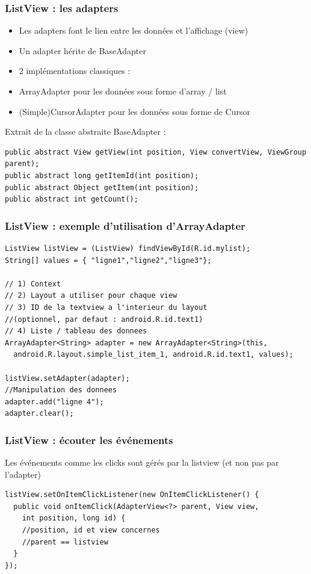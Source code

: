 \documentclass{beamer}
\begin{document}
\begin{frame}[fragile]
\frametitle{ListView : les adapters}
\begin{itemize}
  \item Les adapters font le lien entre les données et l'affichage (view) 
  \item Un adapter hérite de BaseAdapter
  \item 2 implémentations classiques : 
  \item ArrayAdapter pour les données sous forme d'array / list
  \item (Simple)CursorAdapter pour les données sous forme de Cursor
\end{itemize}
Extrait de la classe abstraite BaseAdapter :
\begin{lstlisting}
public abstract View getView(int position, View convertView, ViewGroup parent);
public abstract long getItemId(int position);
public abstract Object getItem(int position);
public abstract int getCount();
\end{lstlisting}
\end{frame}
\begin{frame}[fragile]
\frametitle{ListView : exemple d'utilisation d'ArrayAdapter}
\begin{lstlisting}
ListView listView = (ListView) findViewById(R.id.mylist);
String[] values = { "ligne1","ligne2","ligne3"};

// 1) Context
// 2) Layout a utiliser pour chaque view
// 3) ID de la textview a l'interieur du layout 
//(optionnel, par defaut : android.R.id.text1) 
// 4) Liste / tableau des donnees
ArrayAdapter<String> adapter = new ArrayAdapter<String>(this,
  android.R.layout.simple_list_item_1, android.R.id.text1, values);

listView.setAdapter(adapter); 
//Manipulation des donnees
adapter.add("ligne 4");
adapter.clear();
\end{lstlisting}
\end{frame}
\begin{frame}[fragile]
\frametitle{ListView : écouter les événements}
Les événements comme les clicks sont gérés par la listview (et non pas par l'adapter)
\begin{lstlisting}
listView.setOnItemClickListener(new OnItemClickListener() {
  public void onItemClick(AdapterView<?> parent, View view,
    int position, long id) {
    //position, id et view concernes 
    //parent == listview
  }
});
\end{lstlisting}
\end{frame}
\end{document}
